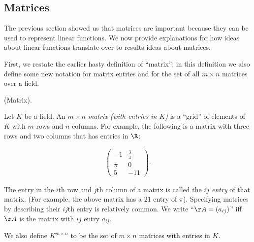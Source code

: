 \newpage

\subsection*{Matrices}

The previous section showed us that matrices are important because they can be used to represent linear functions. We now provide explanations for how ideas about linear functions translate over to results ideas about matrices.

First, we restate the earlier hasty definition of ``matrix''; in this definition we also define some new notation for matrix entries and for the set of all $m \times n$ matrices over a field.

\begin{defn}
    (Matrix).
    
    Let $K$ be a field. An \textit{$m \times n$ matrix (with entries in $K$)} is a ``grid'' of elements of $K$ with $m$ rows and $n$ columns. For example, the following is a matrix with three rows and two columns that has entries in $\R$:
    
    \begin{align*}
        \begin{pmatrix}
            -1 & \frac{3}{4} \\
            \pi & 0 \\
            5 & -11
        \end{pmatrix}.
    \end{align*}
    
    The entry in the $i$th row and $j$th column of a matrix is called the \textit{$ij$ entry} of that matrix. (For example, the above matrix has a $21$ entry of $\pi$). Specifying matrices by describing their $ij$th entry is relatively common. We write ``$\AA = (a_{ij})$'' iff $\AA$ is the matrix with $ij$ entry $a_{ij}$.
    
    We also define $K^{m \times n}$ to be the set of $m \times n$ matrices with entries in $K$.
\end{defn}

